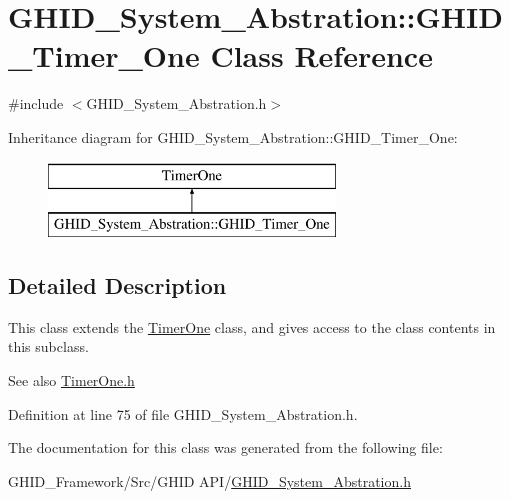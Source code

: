 \hypertarget{class_g_h_i_d___system___abstration_1_1_g_h_i_d___timer___one}{\section{\-G\-H\-I\-D\-\_\-\-System\-\_\-\-Abstration\-:\-:\-G\-H\-I\-D\-\_\-\-Timer\-\_\-\-One \-Class \-Reference}
\label{class_g_h_i_d___system___abstration_1_1_g_h_i_d___timer___one}
}


{\ttfamily \#include $<$\-G\-H\-I\-D\-\_\-\-System\-\_\-\-Abstration.\-h$>$}

\-Inheritance diagram for \-G\-H\-I\-D\-\_\-\-System\-\_\-\-Abstration\-:\-:\-G\-H\-I\-D\-\_\-\-Timer\-\_\-\-One\-:\begin{figure}[H]
\begin{center}
\leavevmode
\includegraphics[height=2.000000cm]{class_g_h_i_d___system___abstration_1_1_g_h_i_d___timer___one}
\end{center}
\end{figure}


\subsection{\-Detailed \-Description}
\-This class extends the \hyperlink{class_timer_one}{\-Timer\-One} class, and gives access to the class contents in this subclass.

\begin{DoxySeeAlso}{\-See also}
\hyperlink{_timer_one_8h}{\-Timer\-One.\-h} 
\end{DoxySeeAlso}


\-Definition at line 75 of file \-G\-H\-I\-D\-\_\-\-System\-\_\-\-Abstration.\-h.



\-The documentation for this class was generated from the following file\-:\begin{DoxyCompactItemize}
\item 
\-G\-H\-I\-D\-\_\-\-Framework/\-Src/\-G\-H\-I\-D A\-P\-I/\hyperlink{_g_h_i_d___system___abstration_8h}{\-G\-H\-I\-D\-\_\-\-System\-\_\-\-Abstration.\-h}\end{DoxyCompactItemize}
